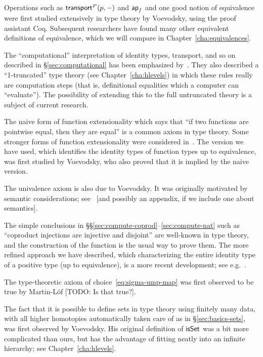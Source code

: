 Operations such as $\mathsf{transport}^{P}(p,-)$ and $\mathsf{ap}_{f}$ and one good notion of equivalence were first studied extensively in type theory by Voevodsky, using the proof assistant Coq.
Subsequent researchers have found many other equivalent definitions of equivalence, which we will compare in Chapter~\ref{cha:equivalences}.

The ``computational'' interpretation of identity types, transport, and so on described in \S\ref{sec:computational} has been emphasized by~\cite{lh:canonicity}.
They also described a ``1-truncated'' type theory (see Chapter~\ref{cha:hlevels}) in which these rules really are computation steps (that is, definitional equalities which a computer can ``evaluate'').
The possibility of extending this to the full untruncated theory is a subject of current research.

The naive form of function extensionality which says that ``if two functions are pointwise equal, then they are equal'' is a common axiom in type theory.
Some stronger forms of function extensionality were considered in~\cite{garner:depprod}.
The version we have used, which identifies the identity types of function types up to equivalence, was first studied by Voevodsky, who also proved that it is implied by the naive version.

The univalence axiom is also due to Voevodsky.
It was originally motivated by semantic considerations; see~\cite{klv:ssetmodel} [and possibly an appendix, if we include one about semantics].

The simple conclusions in \S\S\ref{sec:compute-coprod}--\ref{sec:compute-nat} such as ``coproduct injections are injective and disjoint'' are well-known in type theory, and the construction of the function \encode is the usual way to prove them.
The more refined approach we have described, which characterizing the entire identity type of a positive type (up to equivalence), is a more recent development; see e.g.~\cite{ls:pi1s1}.

The type-theoretic axiom of choice~\eqref{eq:sigma-ump-map} was first observed to be true by Martin-L\"of [TODO: Is that true?].

The fact that it is possible to define sets in type theory using finitely many data, with all higher homotopies automatically taken care of as in \S\ref{sec:basics-sets}, was first observed by Voevodsky.
His original definition of $\mathsf{isSet}$ was a bit more complicated than ours, but has the advantage of fitting neatly into an infinite hierarchy; see Chapter~\ref{cha:hlevels}.

